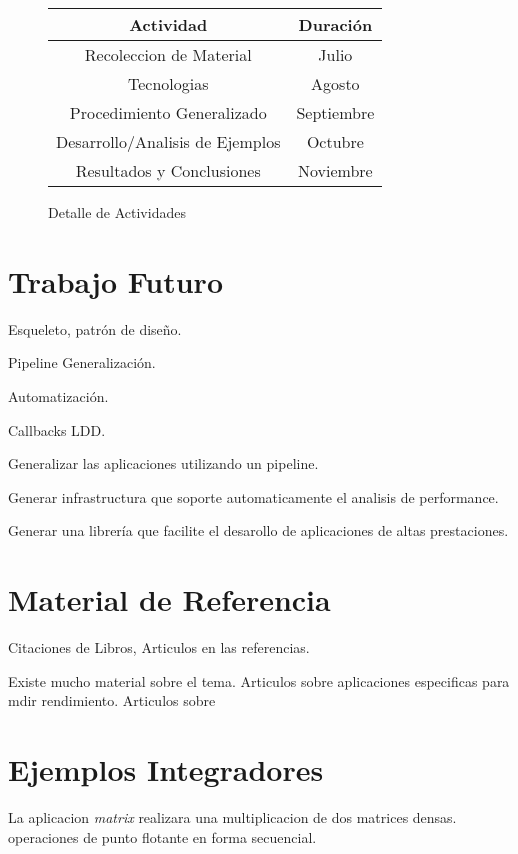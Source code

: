 \documentclass[a4paper,twocolumn]{article}
\begin{document}
\begin{figure}[H]
  \begin{center}
    \begin{tabular}{|c|c|}\hline
      {\bf Actividad} & {\bf Duraci\'on} \\ \hline
      Recoleccion de Material & Julio \\ \hline
      Tecnologias & Agosto \\ \hline
      Procedimiento Generalizado & Septiembre \\ \hline
      Desarrollo/Analisis de Ejemplos & Octubre \\ \hline
      Resultados y Conclusiones & Noviembre \\ \hline
    \end{tabular}
    \caption{Detalle de Actividades}
  \end{center}
  \label{schedule}
\end{figure}

\section{Trabajo Futuro}

Esqueleto, patr\'on de dise\~no.

Pipeline Generalizaci\'on.

Automatizaci\'on.

Callbacks LDD.

Generalizar las aplicaciones utilizando un pipeline.

Generar infrastructura que soporte automaticamente el analisis de performance.

Generar una librer\'ia que facilite el desarollo de aplicaciones de altas prestaciones.

\section{Material de Referencia}

Citaciones de Libros, Articulos en las referencias.

Existe mucho material sobre el tema.
Articulos sobre aplicaciones especificas para mdir rendimiento.
Articulos sobre 

\appendix

\section{Ejemplos Integradores}

La aplicacion \emph{matrix} realizara una multiplicacion de dos matrices densas.
operaciones de punto flotante en forma secuencial.
\end{document}
